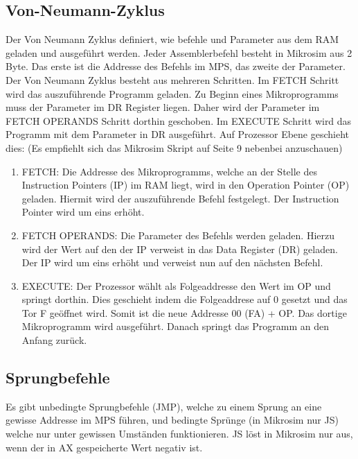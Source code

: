 \documentclass{article}
\begin{document}
\subsection*{Von-Neumann-Zyklus}
Der Von Neumann Zyklus definiert, wie befehle und Parameter aus dem RAM geladen und ausgeführt werden.
Jeder Assemblerbefehl besteht in Mikrosim aus 2 Byte. Das erste ist die Addresse des Befehls im MPS, das zweite der Parameter.\newline
Der Von Neumann Zyklus besteht aus mehreren Schritten.\newline
Im FETCH Schritt wird das auszuführende Programm geladen.\newline
Zu Beginn eines Mikroprogramms muss der Parameter im DR Register liegen. Daher wird der Parameter im FETCH OPERANDS Schritt dorthin geschoben.\newline
Im EXECUTE Schritt wird das Programm mit dem Parameter in DR ausgeführt.\newline
Auf Prozessor Ebene geschieht dies: (Es empfiehlt sich das Mikrosim Skript auf Seite 9 nebenbei anzuschauen)
\begin{enumerate}
    \item FETCH: Die Addresse des Mikroprogramms, welche an der Stelle des Instruction Pointers (IP) im RAM liegt, wird in den Operation Pointer
    (OP) geladen. Hiermit wird der auszuführende Befehl festgelegt. Der Instruction Pointer wird um eins erhöht.
    \item FETCH OPERANDS: Die Parameter des Befehls werden geladen. Hierzu wird der Wert auf den der IP verweist in das Data Register (DR)
    geladen. Der IP wird um eins erhöht und verweist nun auf den nächsten Befehl.
    \item EXECUTE: Der Prozessor wählt als Folgeaddresse den Wert im OP und springt dorthin. Dies geschieht indem die Folgeaddrese auf 
    0 gesetzt und das Tor F geöffnet wird. Somit ist die neue Addresse 00 (FA) + OP. Das dortige Mikroprogramm wird ausgeführt.
    Danach springt das Programm an den Anfang zurück.
\end{enumerate}

\subsection*{Sprungbefehle}
Es gibt unbedingte Sprungbefehle (JMP), welche zu einem Sprung an eine gewisse Addresse im MPS führen, und bedingte Sprünge
(in Mikrosim nur JS) welche nur unter gewissen Umständen funktionieren. JS löst in Mikrosim nur aus, wenn der in AX gespeicherte
Wert negativ ist.
\end{document}
